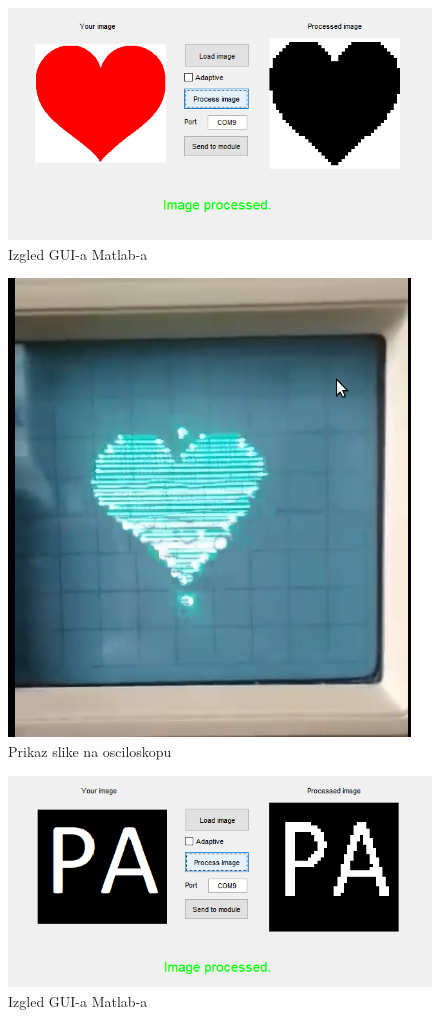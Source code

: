 \documentclass[12pt]{article}
\begin{document}
\begin{figure}[h!]
    \centering
  \includegraphics[scale=0.4]{51427942_1953607828071413_2929664988660367360_n.png}
  \caption{Izgled GUI-a Matlab-a}
  \label{fig:gui3}
\end{figure}
\begin{figure}[h!]
    \centering
  \includegraphics[scale=0.5]{srcefinal.jpg}
  \caption{Prikaz slike na osciloskopu}
  \label{fig:srce}
\end{figure}
\begin{figure}[h!]
    \centering
  \includegraphics[scale=0.4]{51558858_373678219851352_3569912928796672000_n.png}
  \caption{Izgled GUI-a Matlab-a}
  \label{fig:gui4}
\end{figure}
\end{document}
